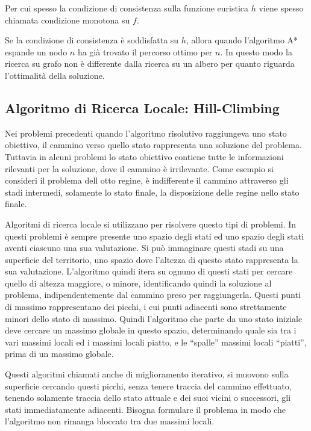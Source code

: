 \documentclass{article}
\numberwithin{equation}{subsection}
\begin{document}
Per cui spesso la condizione di consistenza sulla funzione euristica $h$ viene spesso chiamata 
condizione monotona su $f$. 

Se la condizione di consistenza è soddisfatta su $h$, allora quando l'algoritmo A* espande un nodo 
$n$ ha già trovato il percorso ottimo per $n$. In questo modo la ricerca su grafo non è 
differente dalla ricerca su un albero per quanto riguarda l'ottimalità della soluzione. 


\subsection{Algoritmo di Ricerca Locale: Hill-Climbing}


Nei problemi precedenti quando l'algoritmo risolutivo raggiungeva uno stato obiettivo, il cammino verso quello stato rappresenta una soluzione 
del problema. Tuttavia in alcuni problemi lo stato obiettivo contiene tutte le informazioni rilevanti per la soluzione, dove il cammino è 
irrilevante. Come esempio si consideri il problema dell otto regine, è indifferente il cammino attraverso gli stadi intermedi, solamente lo 
stato finale, la disposizione delle regine nello stato finale. 

Algoritmi di ricerca locale si utilizzano per risolvere questo tipi di problemi. In questi problemi è sempre presente uno spazio degli stati 
ed uno spazio degli stati aventi ciascuno una sua valutazione. Si può immaginare questi stadi su una superficie del territorio, uno spazio dove l'altezza 
di questo stato rappresenta la sua valutazione. L'algoritmo quindi itera su ognuno di questi stati per cercare quello di altezza maggiore, o minore, identificando 
quindi la soluzione al problema, indipendentemente dal cammino preso per raggiungerla. Questi punti di massimo rappresentano dei picchi, i cui punti adiacenti sono 
strettamente minori dello stato di massimo. Quindi l'algoritmo che parte da uno stato iniziale deve cercare un massimo globale in questo spazio, determinando quale sia 
tra i vari massimi locali ed i massimi locali piatto, e le ``spalle'' massimi locali ``piatti'', prima di un massimo globale. 


Questi algoritmi chiamati anche di miglioramento iterativo, si muovono sulla superficie cercando questi picchi, senza tenere traccia del cammino effettuato, tenendo 
solamente traccia dello stato attuale e dei suoi vicini o successori, gli stati immediatamente adiacenti. 
Bisogna formulare il problema in modo che l'algoritmo non rimanga bloccato tra due massimi locali. 
\end{document}
